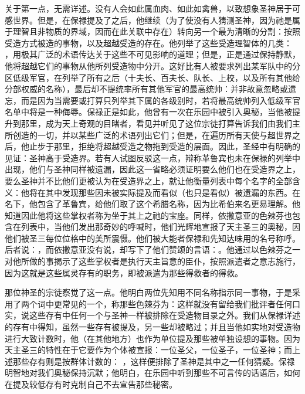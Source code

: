 关于第一点，无需详述。没有人会如此属血肉、如此如禽兽，以致想象圣神居于可感世界。但是，在保禄提及了之后，他继续（为了使没有人猜测圣神，因为祂是属于理智且非物质的界域，因而在此关联中存在）转向另一个最为清晰的分割：按照受造方式被造的事物，以及超越受造的存在。他列举了这些受造理智体的几类：   ，用极其广泛的术语传达关于这些不可见影响的道理；但是，正是通过保持静默，他将超越它们的事物从他所列受造物中分开。这好比有人被要求列出某军队中的分区低级军官，在列举了所有之后（十夫长、百夫长、队长、上校，以及所有其他给分部权威的名称），最后却不提统率所有其他军官的最高统帅：并非故意忽略或遗忘，而是因为当需要或打算只列举其下属的各级别时，若将最高统帅列入低级军官名单中将是一种侮辱。保禄正是如此，他曾有一次在乐园中被引入奥秘，当他被提升到那里，成为天上奇观的目睹者，看见并听见了这位宗徒打算告诉我们由我们主所创造的一切，并以某些广泛的术语列出它们；但是，在遍历所有天使与超世界之后，他止步于那里，拒绝将超越受造之物拖到受造的层面。因此，圣经中有明确的见证：圣神高于受造界。若有人试图反驳这一点，辩称革鲁宾也未在保禄的列举中出现，他们与圣神同样被遗漏，因此这一省略必须证明要么他们也在受造界之上，要么圣神并不比他们更被认为在受造界之上，就让他衡量列表中每个名字的全部含义：他将在其中发现那些因未被实际提及而看似（也只是看似）被遗漏的东西。在名下，他包含了革鲁宾，给他们取了这个希腊名称，因为比希伯来名更易理解。他知道因此他将这些掌权者称为坐于其上之祂的宝座。同样，依撒意亚的色辣芬也包含在列表中，当他们发出那奇妙的呼喊时，他们光辉地宣报了天主圣三的奥秘，因他们被圣三每位位格中的美所震慑。他们被大能者保禄和先知达味用的名号称呼。后者说：，而依撒意亚没有说，却写下了他们赞颂的言语：。他通过以色辣芬之一对他所做的事揭示了这些掌权者是执行天主旨意的臣仆，按照派遣者之意志施行，因为这就是这些属灵存有的职务，即被派遣为那些得救者的得救。\par

那位神圣的宗徒察觉了这一点。他明白两位先知用不同名称指示同一事物，于是采用了两个词中更常见的一个，称那些色辣芬为：这样就没有留给我们批评者任何口实，说这些存有中任何一个与圣神一样被排除在受造物目录之外。我们从保禄详述的存有中得知，虽然一些存有被提及，另一些却被略过；并且当他如实地对受造物进行大致计数时，他（在其他地方）也作为单位提及那些被单独设想的事物。因为天主圣三的特性在于它要作为个体被宣报：一位圣父，一位圣子，一位圣神；而上述那些存有则是按群体计数的：   ，这样便排除了圣神是其中之一任何猜疑。保禄明智地对我们奥秘保持沉默；他明白，在乐园中听到那些不可言传的话语后，如何在提及较低存有时克制自己不去宣告那些秘密。\par

